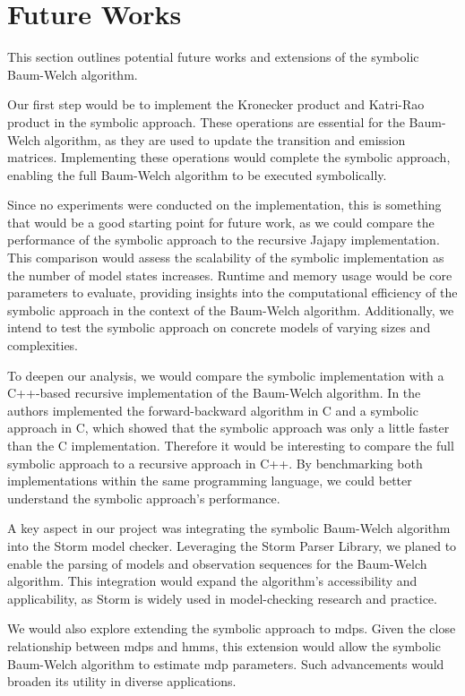 \section{Future Works}\label{sec:future_works}
This section outlines potential future works and extensions of the symbolic Baum-Welch algorithm.

Our first step would be to implement the Kronecker product and Katri-Rao product in the symbolic approach. 
These operations are essential for the Baum-Welch algorithm, as they are used to update the transition and emission matrices.
Implementing these operations would complete the symbolic approach, enabling the full Baum-Welch algorithm to be executed symbolically.

Since no experiments were conducted on the implementation, this is something that would be a good starting point for future work, as we could compare the performance of the symbolic approach to the recursive Jajapy implementation.
This comparison would assess the scalability of the symbolic implementation as the number of model states increases. 
Runtime and memory usage would be core parameters to evaluate, providing insights into the computational efficiency of the symbolic approach in the context of the Baum-Welch algorithm.
Additionally, we intend to test the symbolic approach on concrete models of varying sizes and complexities. 

To deepen our analysis, we would compare the symbolic implementation with a C++-based recursive implementation of the Baum-Welch algorithm. 
In \cite{p7} the authors implemented the forward-backward algorithm in C and a symbolic approach in C, which showed that the symbolic approach was only a little faster than the C implementation.
Therefore it would be interesting to compare the full symbolic approach to a recursive approach in C++.
By benchmarking both implementations within the same programming language, we could better understand the symbolic approach's performance.

A key aspect in our project was integrating the symbolic Baum-Welch algorithm into the Storm model checker. 
Leveraging the Storm Parser Library, we planed to enable the parsing of models and observation sequences for the Baum-Welch algorithm.
This integration would expand the algorithm's accessibility and applicability, as Storm is widely used in model-checking research and practice.

We would also explore extending the symbolic approach to \glspl{mdp}. 
Given the close relationship between \glspl{mdp} and \glspl{hmm}, this extension would allow the symbolic Baum-Welch algorithm to estimate \gls{mdp} parameters. 
Such advancements would broaden its utility in diverse applications.

